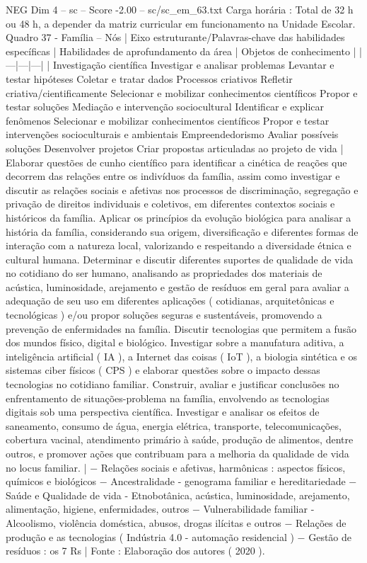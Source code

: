 \begin{textsample}{NEG Dim 4 – sc – Score -2.00 – sc/sc\_em\_63.txt}
Carga horária : Total de 32 h ou 48 h, a depender da matriz curricular em funcionamento na Unidade Escolar.
Quadro 37 - Família – Nós | Eixo estruturante/Palavras-chave das habilidades específicas | Habilidades de aprofundamento da área | Objetos de conhecimento | |---|---|---| | Investigação científica Investigar e analisar problemas Levantar e testar hipóteses Coletar e tratar dados Processos criativos Refletir criativa/cientificamente Selecionar e mobilizar conhecimentos científicos Propor e testar soluções Mediação e intervenção sociocultural Identificar e explicar fenômenos Selecionar e mobilizar conhecimentos científicos Propor e testar intervenções socioculturais e ambientais Empreendedorismo Avaliar possíveis soluções Desenvolver projetos Criar propostas articuladas ao projeto de vida | Elaborar questões de cunho científico para identificar a cinética de reações que decorrem das relações entre os indivíduos da família, assim como investigar e discutir as relações sociais e afetivas nos processos de discriminação, segregação e privação de direitos individuais e coletivos, em diferentes contextos sociais e históricos da família.
Aplicar os princípios da evolução biológica para analisar a história da família, considerando sua origem, diversificação e diferentes formas de interação com a natureza local, valorizando e respeitando a diversidade étnica e cultural humana.
Determinar e discutir diferentes suportes de qualidade de vida no cotidiano do ser humano, analisando as propriedades dos materiais de acústica, luminosidade, arejamento e gestão de resíduos em geral para avaliar a adequação de seu uso em diferentes aplicações ( cotidianas, arquitetônicas e tecnológicas ) e/ou propor soluções seguras e sustentáveis, promovendo a prevenção de enfermidades na família.
Discutir tecnologias que permitem a fusão dos mundos físico, digital e biológico.
Investigar sobre a manufatura aditiva, a inteligência artificial ( IA ), a Internet das coisas ( IoT ), a biologia sintética e os sistemas ciber físicos ( CPS ) e elaborar questões sobre o impacto dessas tecnologias no cotidiano familiar.
Construir, avaliar e justificar conclusões no enfrentamento de situações-problema na família, envolvendo as tecnologias digitais sob uma perspectiva científica.
Investigar e analisar os efeitos de saneamento, consumo de água, energia elétrica, transporte, telecomunicações, cobertura vacinal, atendimento primário à saúde, produção de alimentos, dentre outros, e promover ações que contribuam para a melhoria da qualidade de vida no locus familiar. | − Relações sociais e afetivas, harmônicas : aspectos físicos, químicos e biológicos − Ancestralidade - genograma familiar e hereditariedade − Saúde e Qualidade de vida - Etnobotânica, acústica, luminosidade, arejamento, alimentação, higiene, enfermidades, outros − Vulnerabilidade familiar - Alcoolismo, violência doméstica, abusos, drogas ilícitas e outros − Relações de produção e as tecnologias ( Indústria 4.0 - automação residencial ) − Gestão de resíduos : os 7 Rs | Fonte : Elaboração dos autores ( 2020 ).

\end{textsample}
